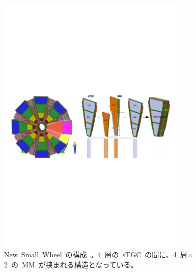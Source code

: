 \begin{figure}[H]
        \centering   
        \includegraphics[width=0.8\textwidth,page=1]{img/pdf/nsw.pdf}
        \caption[New~Small~Wheel~の構成]{New~Small~Wheel~の構成~\cite{AR:14}。4~層の~sTGC~の間に、4~層$\times$2~の~MM~が挟まれる構造となっている。}
        \label{fig:nsw}
\end{figure}

